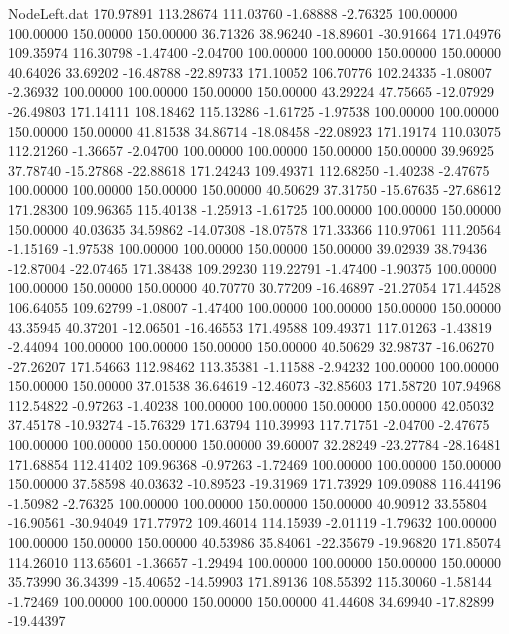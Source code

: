 \begin{filecontents}{NodeLeft.dat}
 170.97891  113.28674  111.03760    -1.68888   -2.76325  100.00000  100.00000  150.00000  150.00000   36.71326   38.96240  -18.89601  -30.91664
 171.04976  109.35974  116.30798    -1.47400   -2.04700  100.00000  100.00000  150.00000  150.00000   40.64026   33.69202  -16.48788  -22.89733
 171.10052  106.70776  102.24335    -1.08007   -2.36932  100.00000  100.00000  150.00000  150.00000   43.29224   47.75665  -12.07929  -26.49803
 171.14111  108.18462  115.13286    -1.61725   -1.97538  100.00000  100.00000  150.00000  150.00000   41.81538   34.86714  -18.08458  -22.08923
 171.19174  110.03075  112.21260    -1.36657   -2.04700  100.00000  100.00000  150.00000  150.00000   39.96925   37.78740  -15.27868  -22.88618
 171.24243  109.49371  112.68250    -1.40238   -2.47675  100.00000  100.00000  150.00000  150.00000   40.50629   37.31750  -15.67635  -27.68612
 171.28300  109.96365  115.40138    -1.25913   -1.61725  100.00000  100.00000  150.00000  150.00000   40.03635   34.59862  -14.07308  -18.07578
 171.33366  110.97061  111.20564    -1.15169   -1.97538  100.00000  100.00000  150.00000  150.00000   39.02939   38.79436  -12.87004  -22.07465
 171.38438  109.29230  119.22791    -1.47400   -1.90375  100.00000  100.00000  150.00000  150.00000   40.70770   30.77209  -16.46897  -21.27054
 171.44528  106.64055  109.62799    -1.08007   -1.47400  100.00000  100.00000  150.00000  150.00000   43.35945   40.37201  -12.06501  -16.46553
 171.49588  109.49371  117.01263    -1.43819   -2.44094  100.00000  100.00000  150.00000  150.00000   40.50629   32.98737  -16.06270  -27.26207
 171.54663  112.98462  113.35381    -1.11588   -2.94232  100.00000  100.00000  150.00000  150.00000   37.01538   36.64619  -12.46073  -32.85603
 171.58720  107.94968  112.54822    -0.97263   -1.40238  100.00000  100.00000  150.00000  150.00000   42.05032   37.45178  -10.93274  -15.76329
 171.63794  110.39993  117.71751    -2.04700   -2.47675  100.00000  100.00000  150.00000  150.00000   39.60007   32.28249  -23.27784  -28.16481
 171.68854  112.41402  109.96368    -0.97263   -1.72469  100.00000  100.00000  150.00000  150.00000   37.58598   40.03632  -10.89523  -19.31969
 171.73929  109.09088  116.44196    -1.50982   -2.76325  100.00000  100.00000  150.00000  150.00000   40.90912   33.55804  -16.90561  -30.94049
 171.77972  109.46014  114.15939    -2.01119   -1.79632  100.00000  100.00000  150.00000  150.00000   40.53986   35.84061  -22.35679  -19.96820
 171.85074  114.26010  113.65601    -1.36657   -1.29494  100.00000  100.00000  150.00000  150.00000   35.73990   36.34399  -15.40652  -14.59903
 171.89136  108.55392  115.30060    -1.58144   -1.72469  100.00000  100.00000  150.00000  150.00000   41.44608   34.69940  -17.82899  -19.44397

\end{filecontents}
